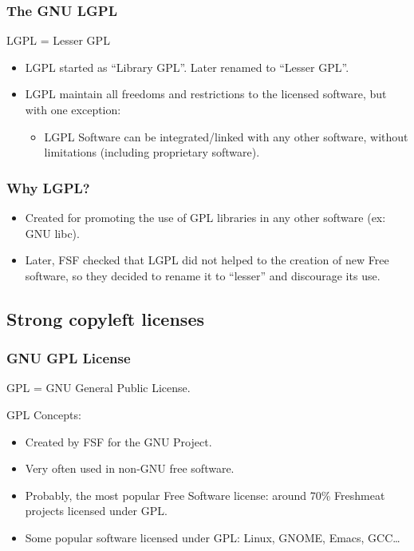 
\begin{frame}
\frametitle{The GNU LGPL}

\begin{center}
LGPL = Lesser GPL
\end{center}

\begin{itemize}
\item LGPL started as ``Library GPL''. Later renamed to ``Lesser
  GPL''.
\item LGPL maintain all freedoms and restrictions to the licensed
  software, but with one exception:
\begin{itemize}
\item LGPL Software can be integrated/linked with any other software, without
  limitations (including proprietary software).
\end{itemize}
\end{itemize}

\end{frame}


\begin{frame}
\frametitle{Why LGPL?}


\begin{itemize}
\item Created for promoting the use of GPL libraries in any other
  software (ex: GNU libc).
\item Later, FSF checked that LGPL did not helped to the creation of
  new Free software, so they decided to rename it to ``lesser'' and
  discourage its use.
\end{itemize}

\end{frame}


\subsection{Strong copyleft licenses}

\begin{frame}
\frametitle{GNU GPL License}

\begin{center}
\item GPL = GNU General Public License.
\end{center}

GPL Concepts:
\begin{itemize}
\item Created by FSF for the GNU Project.
\item Very often used in non-GNU free software.
\item Probably, the most popular Free Software license: around 70\%
  Freshmeat projects licensed under GPL.
\item Some popular software licensed under GPL: Linux, GNOME, Emacs,
 GCC\ldots
\end{itemize}

\end{frame}



